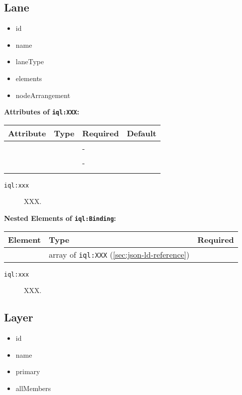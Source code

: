 \documentclass[11pt]{article}
\newcommand{\iqlns}{iql:}
\newcommand{\iqlType}[1]{\texttt{\iqlns#1}}
\newcommand{\attributes}[1]{\noindent\textbf{Attributes of \iqlType{#1}:}\newline\medskip}
\newcommand{\elements}[1]{\noindent\textbf{Nested Elements of \iqlType{#1}:}\newline\medskip}
\begin{document}
\subsection{Lane}
\label{sec:json-ld-lane}
\begin{itemize}
\item id
\item name
\item laneType
\item elements
\item nodeArrangement
\end{itemize}
\attributes{XXX}
\begin{tabular}{|p{}|p{}|p{}|p{}|}
	\hline
	\textbf{Attribute} & \textbf{Type} & \textbf{Required} & \textbf{Default} \\ 
	\hline
	\hline
	&  & - &  \\ 
	\hline 
	&  & - &  \\ 
	\hline 
	&  &  & \\ 
	\hline 
\end{tabular}
\begin{description}
	\item[\iqlType{xxx}] XXX.
\end{description}
\elements{Binding}
\begin{tabular}{|p{}|p{}|p{}|}
	\hline
	\textbf{Element} & \textbf{Type} & \textbf{Required} \\ 
	\hline
	\hline 
	& array of \iqlType{XXX} (\ref{sec:json-ld-reference}) &  \\ 
	\hline 
\end{tabular}
\begin{description}
	\item[\iqlType{xxx}] XXX.
\end{description}

\subsection{Layer}
\label{sec:json-ld-layer}
\begin{itemize}
\item id
\item name
\item primary
\item allMembers
\end{itemize}
\end{document}
